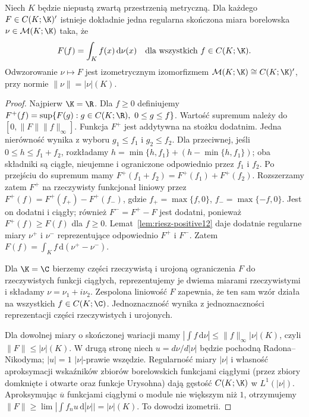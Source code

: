 \begin{twierdzenie}
\label{thm:riesz-markov12}
Niech $K$ będzie niepustą zwartą przestrzenią metryczną.
Dla każdego $F\in C(K;\K)'$ istnieje dokładnie jedna
regularna skończona miara borelowska $\nu\in\mathcal M(K;\K)$
taka, że
\[
 F(f)=\int_K f(x)\,\mathrm d\nu(x)
 \quad\text{dla wszystkich }f\in C(K;\K).
\]
Odwzorowanie $\nu\mapsto F$ jest izometrycznym izomorfizmem
$\mathcal M(K;\K)\cong C(K;\K)'$, przy normie
$\|\nu\|=|\nu|(K)$.
\end{twierdzenie}
\begin{proof}
Najpierw $\K=\R$. Dla $f\ge0$ definiujemy
$F^+(f)=\sup\{F(g):g\in C(K;\R),\ 0\le g\le f\}$.
Wartość supremum należy do $[0,\|F\|\|f\|_\infty]$.
Funkcja $F^+$ jest addytywna na stożku dodatnim.
Jedna nierówność wynika z wyboru $g_1\le f_1$ i
$g_2\le f_2$. Dla przeciwnej, jeśli
$0\le h\le f_1+f_2$, rozkładamy
$h=\min\{h,f_1\}+(h-\min\{h,f_1\})$;
oba składniki są ciągłe, nieujemne i ograniczone odpowiednio
przez $f_1$ i $f_2$. Po przejściu do supremum mamy
$F^+(f_1+f_2)=F^+(f_1)+F^+(f_2)$.
Rozszerzamy zatem $F^+$ na rzeczywisty funkcjonał liniowy
przez $F^+(f)=F^+(f_+)-F^+(f_-)$, gdzie
$f_+=\max\{f,0\}$, $f_-=\max\{-f,0\}$.
Jest on dodatni i ciągły; również $F^-=F^+-F$ jest dodatni,
ponieważ $F^+(f)\ge F(f)$ dla $f\ge0$.
Lemat~\ref{lem:riesz-positive12} daje dodatnie regularne miary
$\nu^+$ i $\nu^-$ reprezentujące odpowiednio $F^+$ i $F^-$.
Zatem $F(f)=\int_Kf\,\mathrm d(\nu^+-\nu^-)$.

Dla $\K=\C$ bierzemy części rzeczywistą i urojoną
ograniczenia $F$ do rzeczywistych funkcji ciągłych,
reprezentujemy je dwiema miarami rzeczywistymi i składamy
$\nu=\nu_1+i\nu_2$. Zespolona liniowość $F$ zapewnia,
że ten sam wzór działa na wszystkich $f\in C(K;\C)$.
Jednoznaczność wynika z jednoznaczności reprezentacji
części rzeczywistych i urojonych.

Dla dowolnej miary o skończonej wariacji mamy
$|\int f\,\mathrm d\nu|\le\|f\|_\infty|\nu|(K)$,
czyli $\|F\|\le|\nu|(K)$. W drugą stronę niech
$u=d\nu/d|\nu|$ będzie pochodną Radona--Nikodyma;
$|u|=1$ $|\nu|$-prawie wszędzie. Regularność miary
$|\nu|$ i własność aproksymacji wskaźników zbiorów
borelowskich funkcjami ciągłymi (przez zbiory domknięte
i otwarte oraz funkcje Urysohna) dają gęstość $C(K;\K)$
w $L^1(|\nu|)$. Aproksymując $\overline u$ funkcjami
ciągłymi o module nie większym niż $1$, otrzymujemy
$\|F\|\ge\lim|\int f_nu\,\mathrm d|\nu||=|\nu|(K)$.
To dowodzi izometrii.
\end{proof}


